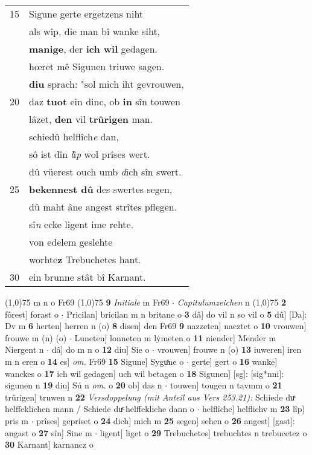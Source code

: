 \documentclass[8pt,a4paper,notitlepage]{article}
\begin{document}
\begin{table}[ht]
\begin{minipage}[t]{0.5\linewidth}
\begin{tabular}{rl}
15 & Sigune gerte ergetzens niht\\ 
 & als wîp, die man bî wanke siht,\\ 
 & \textbf{manige}, der \textbf{ich wil} gedagen.\\ 
 & hœret mê Sigunen triuwe sagen.\\ 
 & \textbf{diu} sprach: "sol mich iht gevrouwen,\\ 
20 & daz \textbf{tuot} ein dinc, ob \textbf{in} sîn touwen\\ 
 & lâzet, \textbf{den} vil \textbf{trûrigen} man.\\ 
 & schiedû helflîch\textit{e} dan,\\ 
 & sô ist dîn \textit{l}î\textit{p} wol prîses wert.\\ 
 & dû vüerest ouch umb \textit{d}ich sîn swert.\\ 
25 & \textbf{bekennest dû} des swertes segen,\\ 
 & dû maht âne angest strîtes pflegen.\\ 
 & sî\textit{n} ecke ligent ime rehte.\\ 
 & von edelem geslehte\\ 
 & worhte\textbf{z} Trebuchetes hant.\\ 
30 & ein brunne stât bî Karnant.\\ 
\end{tabular}
\scriptsize
\line(1,0){75} \newline
m n o Fr69 \newline
\line(1,0){75} \newline
\textbf{9} \textit{Initiale} m Fr69   $\cdot$ \textit{Capitulumzeichen} n  \newline
\line(1,0){75} \newline
\textbf{2} fôrest] forast o  $\cdot$ Pricilan] bricilan m n britane o \textbf{3} dâ] do vil n so vil o \textbf{5} dû] [Da]: Dv m \textbf{6} herten] herren n (o) \textbf{8} disen] den Fr69 \textbf{9} nazzeten] nacztet o \textbf{10} vrouwen] frouwe m (n) (o)  $\cdot$ Luneten] lonneten m lẏmeten o \textbf{11} niender] Mender m Niergent n  $\cdot$ dâ] do m n o \textbf{12} diu] Sie o  $\cdot$ vrouwen] frouwe n (o) \textbf{13} iuweren] iren m n eren o \textbf{14} es] \textit{om.} Fr69 \textbf{15} Sigune] Syguͯne o  $\cdot$ gerte] gert o \textbf{16} wanke] wanckes o \textbf{17} ich wil gedagen] uch wil betagen o \textbf{18} Sigunen] [sg]: [sig*nni]: sigunen n \textbf{19} diu] Sú n \textit{om.} o \textbf{20} ob] das n  $\cdot$ touwen] tougen n tavmm o \textbf{21} trûrigen] truwen n \textbf{22} \textit{Versdoppelung (mit Anteil aus Vers 253.21):} Schiede duͯ helffeklichen mann / Schiede duͯ helffekliche dann o   $\cdot$ helflîche] helflichv m \textbf{23} lîp] pris m  $\cdot$ prîses] gepriset o \textbf{24} dich] mich m \textbf{25} segen] sehen o \textbf{26} angest] [gast]: angast o \textbf{27} sîn] Sine m  $\cdot$ ligent] liget o \textbf{29} Trebuchetes] trebuchtes n trebucetez o \textbf{30} Karnant] karnancz o \newline
\end{minipage}
\end{table}
\end{document}
